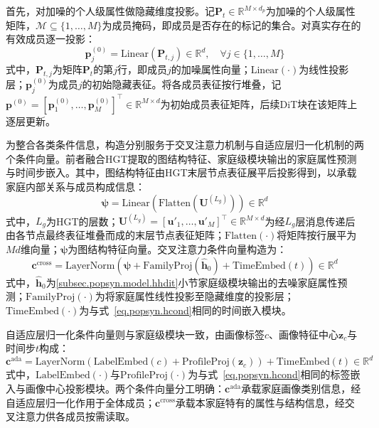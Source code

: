 首先，对加噪的个人级属性做隐藏维度投影。记$\mathbf{P}_t \in \mathbb{R}^{M \times d_p}$为加噪的个人级属性矩阵，$\mathcal{M} \subseteq \{1, \ldots, M\}$为成员掩码，即成员是否存在的标记的集合。对真实存在的有效成员逐一投影：
\begin{equation}
  \mathbf{p}_j^{(0)} = \mathrm{Linear}\left(\mathbf{P}_{t, j}\right) \in \mathbb{R}^{d}, \quad \forall j \in \{1, \ldots, M\}
  \label{eq.popsyn.pproj}
\end{equation}
式中，$\mathbf{P}_{t, j}$为矩阵$\mathbf{P}_t$的第$j$行，即成员$j$的加噪属性向量；$\mathrm{Linear}(\cdot)$为线性投影层；$\mathbf{p}_j^{(0)}$为成员$j$的初始隐藏表征。将各成员表征按行堆叠，记$\mathbf{p}^{(0)} = \left[\mathbf{p}_1^{(0)}, \ldots, \mathbf{p}_M^{(0)}\right]^{\top} \in \mathbb{R}^{M \times d}$为初始成员表征矩阵，后续DiT块在该矩阵上逐层更新。
 
为整合各类条件信息，构造分别服务于交叉注意力机制与自适应层归一化机制的两个条件向量。前者融合HGT提取的图结构特征、家庭级模块输出的家庭属性预测与时间步嵌入。其中，图结构特征由HGT末层节点表征展平后投影得到，以承载家庭内部关系与成员构成信息：
\begin{equation}
  \boldsymbol{\psi} = \mathrm{Linear}\left(\mathrm{Flatten}\left(\mathbf{U}^{(L_g)}\right)\right) \in \mathbb{R}^{d}
  \label{eq.popsyn.graphfeat}
\end{equation}
式中，$L_g$为HGT的层数；$\mathbf{U}^{(L_g)} = \left[\mathbf{u}'_1, \ldots, \mathbf{u}'_M\right]^{\top} \in \mathbb{R}^{M \times d}$为经$L_g$层消息传递后由各节点最终表征堆叠而成的末层节点表征矩阵；$\mathrm{Flatten}(\cdot)$将矩阵按行展平为$Md$维向量；$\boldsymbol{\psi}$为图结构特征向量。交叉注意力条件向量构造为：
\begin{equation}
  \mathbf{c}^{\mathrm{cross}} = \mathrm{LayerNorm}\left(\boldsymbol{\psi} + \mathrm{FamilyProj}\left(\hat{\mathbf{h}}_0\right) + \mathrm{TimeEmbed}(t)\right) \in \mathbb{R}^{d}
  \label{eq.popsyn.crosscond}
\end{equation}
式中，$\hat{\mathbf{h}}_0$为\ref{subsec.popsyn.model.hhdit}小节家庭级模块输出的去噪家庭属性预测；$\mathrm{FamilyProj}(\cdot)$为将家庭属性线性投影至隐藏维度的投影层；$\mathrm{TimeEmbed}(\cdot)$为与式~\eqref{eq.popsyn.hcond}相同的时间嵌入模块。
 
自适应层归一化条件向量则与家庭级模块一致，由画像标签$c$、画像特征中心$\mathbf{z}_c$与时间步$t$构成：
\begin{equation}
  \mathbf{c}^{\mathrm{ada}} = \mathrm{LayerNorm}\left(\mathrm{LabelEmbed}(c) + \mathrm{ProfileProj}(\mathbf{z}_c)\right) + \mathrm{TimeEmbed}(t) \in \mathbb{R}^{d}
  \label{eq.popsyn.adacond}
\end{equation}
式中，$\mathrm{LabelEmbed}(\cdot)$与$\mathrm{ProfileProj}(\cdot)$为与式~\eqref{eq.popsyn.hcond}相同的标签嵌入与画像中心投影模块。两个条件向量分工明确：$\mathbf{c}^{\mathrm{ada}}$承载家庭画像类别信息，经自适应层归一化作用于全体成员；$\mathbf{c}^{\mathrm{cross}}$承载本家庭特有的属性与结构信息，经交叉注意力供各成员按需读取。
 

